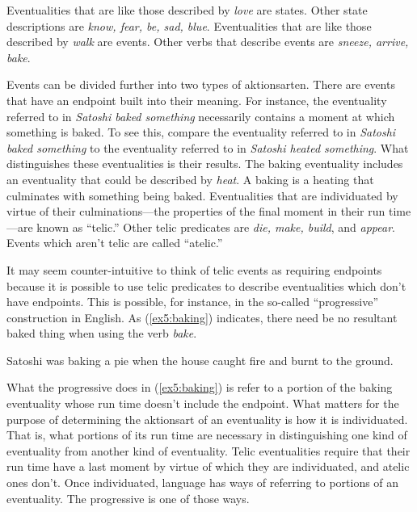  Eventualities that are like those described by \emph{love} are states. Other state descriptions are \emph{know, fear, be, sad, blue}. Eventualities that are like those described by \emph{walk} are events. Other verbs that describe events are \emph{sneeze, arrive, bake}.

Events can be divided further into two types of aktionsarten. There are events that have an endpoint built into their meaning. For instance, the eventuality referred to in \emph{Satoshi baked something} necessarily contains a moment at which something is baked. To see this, compare the eventuality referred to in \emph{Satoshi baked something} to the eventuality referred to in \emph{Satoshi heated something}. What distinguishes these eventualities is their results. The baking eventuality includes an eventuality that could be described by \emph{heat}. A baking is a heating that culminates with something being baked. Eventualities that are individuated by virtue of their culminations---the properties of the final moment in their run time---are known as ``telic.''%
%
%
%
Other telic predicates are \emph{die, make, build}, and \emph{appear}. Events which aren't telic are called ``atelic.''

It may seem counter-intuitive to think of telic events as requiring endpoints because it is possible to use telic predicates to describe eventualities which don't have endpoints. This is possible, for instance, in the so-called ``progressive'' construction in English. As (\ref{ex5:baking}) indicates, there need be no resultant baked thing when using the verb \emph{bake}.
\begin{exe}
	\raggedright
	\ex \label{ex5:baking} 
	Satoshi was baking a pie when the house caught fire and burnt to the ground.
\end{exe}
What the progressive does in (\ref{ex5:baking}) is refer to a portion of the baking eventuality whose run time doesn't include the endpoint. What matters for the purpose of determining the aktionsart of an eventuality is how it is individuated. That is, what portions of its run time are necessary in distinguishing one kind of eventuality from another kind of eventuality. Telic eventualities require that their run time have a last moment by virtue of which they are individuated, and atelic ones don't. Once individuated, language has ways of referring to portions of an eventuality. The progressive is one of those ways.

